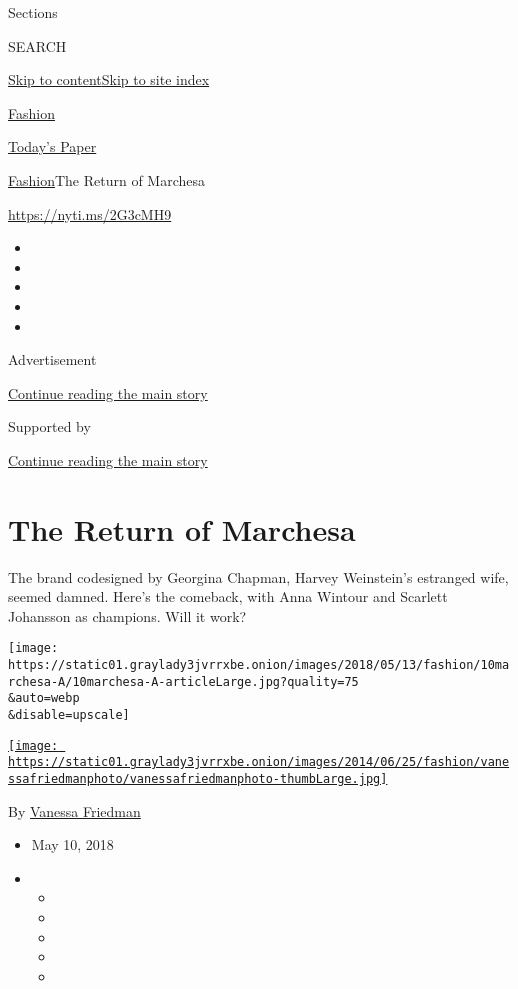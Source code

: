 Sections

SEARCH

\protect\hyperlink{site-content}{Skip to
content}\protect\hyperlink{site-index}{Skip to site index}

\href{https://www.nytimes3xbfgragh.onion/section/fashion}{Fashion}

\href{https://myaccount.nytimes3xbfgragh.onion/auth/login?response_type=cookie\&client_id=vi}{}

\href{https://www.nytimes3xbfgragh.onion/section/todayspaper}{Today's
Paper}

\href{/section/fashion}{Fashion}\textbar{}The Return of Marchesa

\url{https://nyti.ms/2G3cMH9}

\begin{itemize}
\item
\item
\item
\item
\item
\end{itemize}

Advertisement

\protect\hyperlink{after-top}{Continue reading the main story}

Supported by

\protect\hyperlink{after-sponsor}{Continue reading the main story}

\hypertarget{the-return-of-marchesa}{%
\section{The Return of Marchesa}\label{the-return-of-marchesa}}

The brand codesigned by Georgina Chapman, Harvey Weinstein's estranged
wife, seemed damned. Here's the comeback, with Anna Wintour and Scarlett
Johansson as champions. Will it work?

\texttt{[image: https://static01.graylady3jvrrxbe.onion/images/2018/05/13/fashion/10marchesa-A/10marchesa-A-articleLarge.jpg?quality=75\\\&auto=webp\\\&disable=upscale]}

\href{https://www.nytimes3xbfgragh.onion/by/vanessa-friedman}{\texttt{[image: https://static01.graylady3jvrrxbe.onion/images/2014/06/25/fashion/vanessafriedmanphoto/vanessafriedmanphoto-thumbLarge.jpg]}}

By \href{https://www.nytimes3xbfgragh.onion/by/vanessa-friedman}{Vanessa
Friedman}

\begin{itemize}
\item
  May 10, 2018
\item
  \begin{itemize}
  \item
  \item
  \item
  \item
  \item
  \end{itemize}
\end{itemize}

